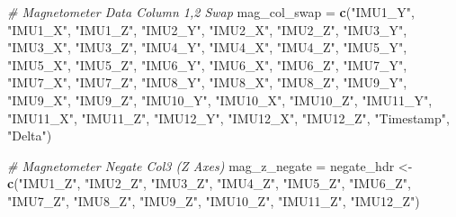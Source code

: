 \documentclass[]{article}
\newenvironment{Shaded}{\begin{snugshade}}{\end{snugshade}}
\newcommand{\CommentTok}[1]{\textcolor[rgb]{0.56,0.35,0.01}{\textit{#1}}}
\newcommand{\KeywordTok}[1]{\textcolor[rgb]{0.13,0.29,0.53}{\textbf{#1}}}
\newcommand{\NormalTok}[1]{#1}
\newcommand{\StringTok}[1]{\textcolor[rgb]{0.31,0.60,0.02}{#1}}
\begin{document}
\begin{Shaded}
\begin{Highlighting}[]
\CommentTok{# Magnetometer Data Column 1,2 Swap }
\NormalTok{mag_col_swap =}\StringTok{ }\KeywordTok{c}\NormalTok{(}\StringTok{"IMU1_Y"}\NormalTok{, }\StringTok{"IMU1_X"}\NormalTok{, }\StringTok{"IMU1_Z"}\NormalTok{,  }
                 \StringTok{"IMU2_Y"}\NormalTok{, }\StringTok{"IMU2_X"}\NormalTok{, }\StringTok{"IMU2_Z"}\NormalTok{,}
                 \StringTok{"IMU3_Y"}\NormalTok{, }\StringTok{"IMU3_X"}\NormalTok{, }\StringTok{"IMU3_Z"}\NormalTok{,}
                 \StringTok{"IMU4_Y"}\NormalTok{, }\StringTok{"IMU4_X"}\NormalTok{, }\StringTok{"IMU4_Z"}\NormalTok{,}
                 \StringTok{"IMU5_Y"}\NormalTok{, }\StringTok{"IMU5_X"}\NormalTok{, }\StringTok{"IMU5_Z"}\NormalTok{,}
                 \StringTok{"IMU6_Y"}\NormalTok{, }\StringTok{"IMU6_X"}\NormalTok{, }\StringTok{"IMU6_Z"}\NormalTok{,}
                 \StringTok{"IMU7_Y"}\NormalTok{, }\StringTok{"IMU7_X"}\NormalTok{, }\StringTok{"IMU7_Z"}\NormalTok{,}
                 \StringTok{"IMU8_Y"}\NormalTok{, }\StringTok{"IMU8_X"}\NormalTok{, }\StringTok{"IMU8_Z"}\NormalTok{,}
                 \StringTok{"IMU9_Y"}\NormalTok{, }\StringTok{"IMU9_X"}\NormalTok{, }\StringTok{"IMU9_Z"}\NormalTok{,  }
                 \StringTok{"IMU10_Y"}\NormalTok{, }\StringTok{"IMU10_X"}\NormalTok{, }\StringTok{"IMU10_Z"}\NormalTok{,}
                 \StringTok{"IMU11_Y"}\NormalTok{, }\StringTok{"IMU11_X"}\NormalTok{, }\StringTok{"IMU11_Z"}\NormalTok{,   }
                 \StringTok{"IMU12_Y"}\NormalTok{, }\StringTok{"IMU12_X"}\NormalTok{, }\StringTok{"IMU12_Z"}\NormalTok{,}
                 \StringTok{"Timestamp"}\NormalTok{,   }\StringTok{"Delta"}\NormalTok{)}


\CommentTok{# Magnetometer Negate Col3 (Z Axes)}
\NormalTok{mag_z_negate =}\StringTok{ }\NormalTok{negate_hdr <-}\StringTok{ }\KeywordTok{c}\NormalTok{(}\StringTok{"IMU1_Z"}\NormalTok{, }\StringTok{"IMU2_Z"}\NormalTok{, }\StringTok{"IMU3_Z"}\NormalTok{, }
                               \StringTok{"IMU4_Z"}\NormalTok{, }\StringTok{"IMU5_Z"}\NormalTok{, }\StringTok{"IMU6_Z"}\NormalTok{, }
                               \StringTok{"IMU7_Z"}\NormalTok{, }\StringTok{"IMU8_Z"}\NormalTok{, }\StringTok{"IMU9_Z"}\NormalTok{, }
                               \StringTok{"IMU10_Z"}\NormalTok{, }\StringTok{"IMU11_Z"}\NormalTok{, }\StringTok{"IMU12_Z"}\NormalTok{)}



\end{Highlighting}
\end{Shaded}
\end{document}
